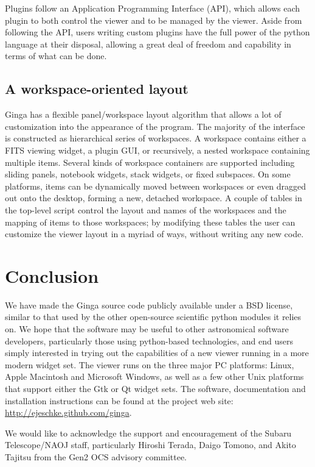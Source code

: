Plugins follow an Application Programming Interface (API), which allows each plugin to both control the viewer and to be managed by the viewer. Aside from following the API, users writing custom plugins have the full power of the python language at their disposal, allowing a great deal of freedom and capability in terms of what can be done.   

\subsection{A workspace-oriented layout}
Ginga has a flexible panel/workspace layout algorithm that allows a lot of customization into the appearance of the program.  The majority of the interface is constructed as hierarchical series of workspaces. A workspace contains either a FITS viewing widget, a plugin GUI, or recursively, a nested workspace containing multiple items. Several kinds of workspace containers are supported including sliding panels, notebook widgets, stack widgets, or fixed subspaces. On some platforms, items can be dynamically moved between workspaces or even dragged out onto the desktop, forming a new, detached workspace. A couple of tables in the top-level script control the layout and names of the workspaces and the mapping of items to those workspaces; by modifying these tables the user can customize the viewer layout in a myriad of ways, without writing any new code. 

\section{Conclusion}
We have made the Ginga source code publicly available under a BSD license, similar to that used by the other open-source scientific python modules it relies on. We hope that the software may be useful to other astronomical software developers, particularly those using python-based technologies, and end users simply interested in trying out the capabilities of a new viewer running in a more modern widget set.  The viewer runs on the three major PC platforms: Linux, Apple Macintosh and Microsoft Windows, as well as a few other Unix platforms that support either the Gtk or Qt widget sets. The software, documentation and installation instructions can be found at the project web site: \url{http://ejeschke.github.com/ginga}.

\acknowledgements We would like to acknowledge the support and encouragement of the Subaru Telescope/NAOJ staff, particularly Hiroshi Terada, Daigo Tomono, and Akito Tajitsu from the Gen2 OCS advisory committee. 


